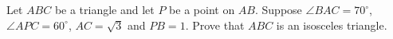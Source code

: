 Let $ABC$ be a triangle and let $P$ be a point on $AB$. Suppose $\angle BAC =
70^{\circ}$, $\angle APC = 60^{\circ}$, $AC = \sqrt{3}$ and $PB = 1$. Prove
that $ABC$ is an isosceles triangle.
